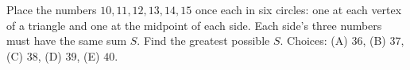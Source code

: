 Place the numbers $10,11,12,13,14,15$ once each in six circles: one at each vertex of a triangle and one at the midpoint of each side. Each side's three numbers must have the same sum $S$. Find the greatest possible $S$. Choices: (A) $36$, (B) $37$, (C) $38$, (D) $39$, (E) $40$.

